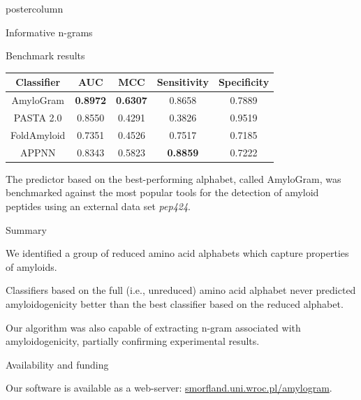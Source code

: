 \documentclass[final]{beamer}\usepackage[]{graphicx}\usepackage[]{color}
\begin{document}
\begin{frame}
\begin{columns}
\begin{column}{.51\textwidth}
\begin{beamercolorbox}[center,wd=\textwidth]{postercolumn}
\begin{minipage}[T]{.95\textwidth}
{\begin{block}{Informative n-grams}
\end{block}
\vfill



\begin{block}{Benchmark results}

\begin{table}[ht]
\centering

\begin{tabular}{ccccc}
  \toprule
Classifier & AUC & MCC & Sensitivity & Specificity \\ 
  \midrule
AmyloGram & \textbf{0.8972} & \textbf{0.6307} & 0.8658 & 0.7889 \\ 
  \rowcolor{white}PASTA 2.0\citep{walsh_pasta_2014} & 0.8550 & 0.4291 & 0.3826 & 0.9519 \\ 
   FoldAmyloid \citep{garbuzynskiy_foldamyloid:_2010} & 0.7351 & 0.4526 & 0.7517 & 0.7185 \\ 
  \rowcolor{white}APPNN \citep{familia_prediction_2015} & 0.8343 & 0.5823 & \textbf{0.8859} & 0.7222 \\ 
   \bottomrule
\end{tabular}
\end{table}

The predictor based on the best-performing alphabet, called AmyloGram, was benchmarked against the most popular tools for the detection of amyloid peptides using an external data set \textit{pep424}.

\end{block}
\vfill



\begin{block}{Summary}

We identified a group of reduced amino acid alphabets which capture properties of amyloids. 

\bigskip

Classifiers based on the full (i.e., unreduced) amino acid alphabet never predicted 
amyloidogenicity better than the best classifier based on the reduced alphabet.

\bigskip

Our algorithm was also capable of extracting n-gram associated with amyloidogenicity, partially confirming experimental results.


\end{block}
\vfill


\begin{block}{Availability and funding}

Our software is available as a web-server: \url{smorfland.uni.wroc.pl/amylogram}.


\end{block}}
\end{minipage}
\end{beamercolorbox}
\end{column}
\end{columns}
\end{frame}
\end{document}

